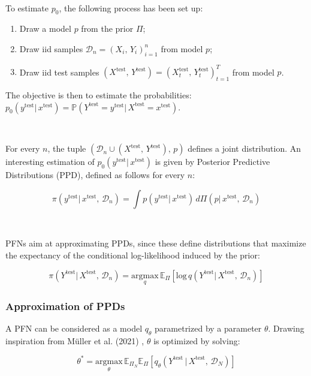 \documentclass{article}
\begin{document}
~

To estimate $p_0$, the following process has been set up:

\begin{enumerate}[label=\roman*]
    \item Draw a model $p$ from the prior $\Pi$;
    \item Draw iid samples $\mathcal{D}_n = (X_i,\, Y_i)_{i=1}^n$ from model $p$;
    \item Draw iid test samples $(X^{\text{test}}, \,  Y^{\text{test}}) = (X_t^{\text{test}}, \,  Y_t^{\text{test}})_{t=1}^T$ from model $p$.
\end{enumerate}

The objective is then to estimate the probabilities: $p_0(y^{\text{test}}|\, x^{\text{test}}) = \mathbb{P}(Y^{\text{test}} = y^{\text{test}}|\, X^{\text{test}} = x^{\text{test}})$.

~

For every $n$, the tuple $(\mathcal{D}_n \cup (X^{\text{test}}, \,  Y^{\text{test}}),\, p)$ defines a joint distribution. An interesting estimation of $p_0(y^{\text{test}}|\, x^{\text{test}})$ is given by Posterior Predictive Distributions (PPD), defined as follows for every $n$:

$$\pi(y^{\text{test}}|\, x^{\text{test}}, \, \mathcal{D}_n) = \int p(y^{\text{test}}|\, x^{\text{test}})\, d\Pi(p|\, x^{\text{test}},\, \mathcal{D}_n)$$

~

PFNs aim at approximating PPDs, since these define distributions that maximize the expectancy of the conditional log-likelihood induced by the prior:

$$\pi(Y^{\text{test}}|\, X^{\text{test}}, \, \mathcal{D}_n) = \underset{q}{\text{argmax}}\, \mathbb{E}_{\Pi}[ \text{log}\, q(Y^{\text{test}}|\, X^{\text{test}}, \, \mathcal{D}_n)]$$

\subsubsection{Approximation of PPDs}

A PFN can be considered as a model $q_{\theta}$ parametrized by a parameter $\theta$. Drawing inspiration from Müller et al. (2021) \cite{muller_transformers_2024}, $\theta$ is optimized by solving:

$$\theta^* = \underset{\theta}{\text{argmax}} \, \mathbb{E}_{\Pi_N} \mathbb{E}_{\Pi} [q_{\theta}(Y^{\text{test}}\, |\, X^{\text{test}}, \, \mathcal{D}_N)]$$
\end{document}
